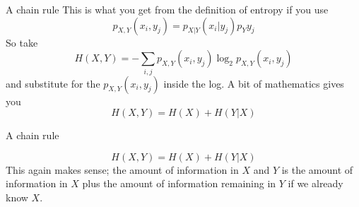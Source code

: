 \documentclass{beamer}
\newcommand{\crish}{\color{reddish}}
\newcommand{\cbla}{\color{black}}
\newcommand{\sm}{\color{reddish}$}
\newcommand{\fm}{$\color{black}{}}
\begin{document}
\begin{frame}{A chain rule}
  This is what you get from the definition of entropy if you use
  \crish
  $$
p_{X,Y}(x_i,y_j)=p_{X|Y}(x_i|y_j)p_Y{y_j}
$$
\cbla
So take
\crish
$$
H(X,Y)=-\sum_{i,j} p_{X,Y}(x_i,y_j)\log_2{p_{X,Y}(x_i,y_j)}
$$
\cbla
and substitute for the \sm{}p_{X,Y}(x_i,y_j)\fm{} inside the log. A bit of mathematics gives you
\crish
$$
H(X,Y)=H(X)+H(Y|X)
$$
\cbla
\end{frame}


\begin{frame}{A chain rule}

\crish
$$
H(X,Y)=H(X)+H(Y|X)
$$ \cbla This again makes sense; the amount of information in
\sm{}X\fm{} and \sm{}Y\fm{} is the amount of information in
\sm{}X\fm{} plus the amount of information remaining in \sm{}Y\fm{} if
we already know \sm{}X\fm{}.

\end{frame}
\end{document}
